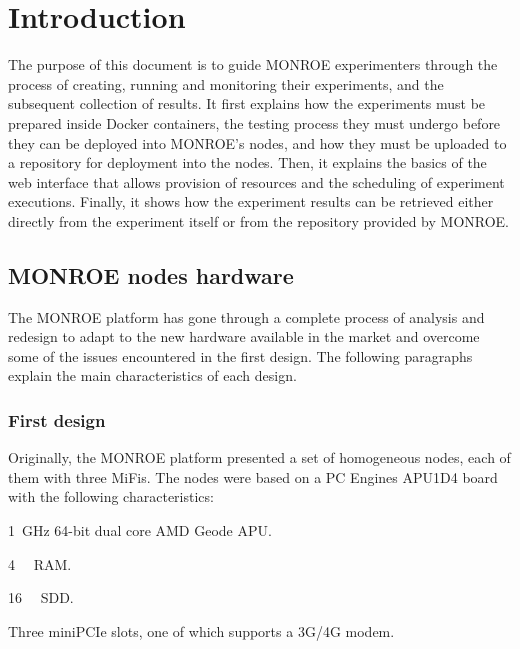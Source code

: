 \documentclass[a4paper,10pt]{article}
\newcommand{\monroe}{MONROE}
\begin{document}

\section{Introduction}
\label{sec:intro}

The purpose of this document is to guide \monroe{} experimenters through the process of creating, running and monitoring their experiments, and the subsequent collection of results.
It first explains how the experiments must be prepared inside Docker containers, the testing process they must undergo before they can be deployed into \monroe{}'s nodes, and how they must be uploaded to a repository for deployment into the nodes.
Then, it explains the basics of the web interface that allows provision of resources and the scheduling of experiment executions.
Finally, it shows how the experiment results can be retrieved either directly from the experiment itself or from the repository provided by \monroe{}.

\subsection{\monroe{} nodes hardware}

The \monroe{} platform has gone through a complete process of analysis and redesign to adapt to the new hardware available in the market and overcome some of the issues encountered in the first design.
The following paragraphs explain the main characteristics of each design.

\subsubsection{First design}
Originally, the \monroe{} platform presented a set of homogeneous nodes, each of them with three MiFis.
The nodes were based on a PC Engines APU1D4 board with the following characteristics:
\begin{itemize*}
	\item \SI{1}{\giga\hertz} 64-bit dual core AMD Geode APU.
	\item \SI{4}{\gibi\byte} RAM.
	\item \SI{16}{\gibi\byte} SDD.
	\item Three miniPCIe slots, one of which supports a 3G/4G modem.
\end{itemize*}
\end{document}
